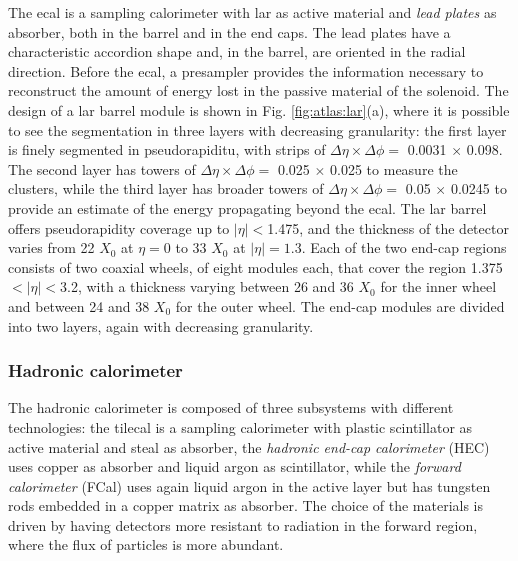 The \gls{ecal} is a sampling calorimeter with \gls{lar} as active material and \textit{lead plates} as absorber, both in the barrel and in the end caps. The lead plates have a characteristic accordion shape and, in the barrel, are oriented in the radial direction. Before the \gls{ecal}, a presampler provides the information necessary to reconstruct the amount of energy lost in the passive material of the solenoid. The design of a \gls{lar} barrel module is shown in Fig. \ref{fig:atlas:lar}(a), where it is possible to see the segmentation in three layers with decreasing granularity: the first layer is finely segmented in pseudorapiditu, with strips of $\Delta\eta \times \Delta\phi = $ 0.0031 $\times$ 0.098. The second layer has towers of $\Delta\eta \times \Delta\phi = $ 0.025 $\times$ 0.025 to measure the clusters, while the third layer has broader towers of $\Delta\eta \times \Delta\phi = $ 0.05 $\times$ 0.0245 to provide an estimate of the energy propagating beyond the \gls{ecal}. The \gls{lar} barrel offers pseudorapidity coverage up to $|\eta|<$1.475, and the thickness of the detector varies from 22 $X_0$ at $\eta=0$ to 33 $X_0$ at $|\eta|=1.3$. 
Each of the two end-cap regions consists of two coaxial wheels, of eight modules each, that cover the region 1.375$<|\eta|<$3.2, with a thickness varying between 26 and 36 $X_0$ for the inner wheel and between 24 and 38 $X_0$ for the outer wheel. The end-cap modules are divided into two layers, again with decreasing granularity.


\subsubsection*{Hadronic calorimeter}

The hadronic calorimeter is composed of three subsystems with different technologies: the \gls{tilecal} \cite{TileTDR} is a sampling calorimeter with plastic scintillator as active material and steal as absorber, the \textit{hadronic end-cap calorimeter} (HEC) uses copper as absorber and liquid argon as scintillator, while the \textit{forward calorimeter} (FCal) uses again liquid argon in the active layer but has tungsten rods embedded in a copper matrix as absorber. The choice of the materials is driven by having detectors more resistant to radiation in the forward region, where the flux of particles is more abundant. 


